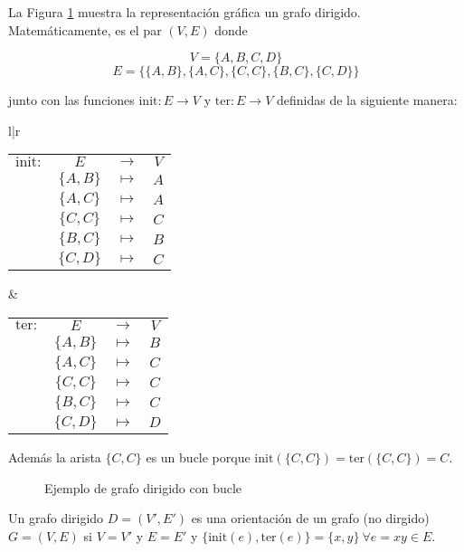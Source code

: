 \begin{ejemplo}
La Figura \ref*{fig:grafo_dirigido} muestra la representación gráfica un grafo dirigido. Matemáticamente, es el par $(V,E)$ donde

\[V  = \{A, B, C, D\}\]
\[E = \{ \{A,B\}, \{A,C\}, \{C,C\},\{B,C\}, \{C,D\} \} \]

junto con las funciones $\mathrm{init} : E \to V $ y $\mathrm{ter} : E \to V$ definidas de la siguiente manera:

\begin{center}
\begin{tabular}{l|r}
\begin{tabular}{r c c c}
$\mathrm{init}:$ & $E$ & $\to$ & $V$\\
			     & $\{A,B\}$ & $\mapsto$ & $A$\\
			     & $\{A,C\}$ & $\mapsto$ & $A$\\
			     & $\{C,C\}$ & $\mapsto$ & $C$\\
			     & $\{B,C\}$ & $\mapsto$ & $B$\\
			     & $\{C,D\}$ & $\mapsto$ & $C$\\
			      
\end{tabular} &
\begin{tabular}{r c c c}
$\mathrm{ter}:$ & $E$ & $\to$ & $V$\\
			     & $\{A,B\}$ & $\mapsto$ & $B$\\
			     & $\{A,C\}$ & $\mapsto$ & $C$\\
			     & $\{C,C\}$ & $\mapsto$ & $C$\\
			     & $\{B,C\}$ & $\mapsto$ & $C$\\
			     & $\{C,D\}$ & $\mapsto$ & $D$\\
			      
\end{tabular} 
\end{tabular}
\end{center}

Además la arista $\{C,C\}$ es un bucle porque $\mathrm{init}(\{C,C\}) = \mathrm{ter}(\{C,C\}) = C$.

\begin{figure}[h]
\centering
\ejemplografodirigido
\caption{Ejemplo de grafo dirigido con bucle}
\label{fig:grafo_dirigido}
\end{figure}

\end{ejemplo}

\begin{defi}
Un grafo dirigido $D = (V', E')$ es una orientación de un grafo (no dirgido) $G = (V,E)$ si $V = V'$ y $E = E'$ y $\{\mathrm{init}(e), \mathrm{ter}(e) \} = \{x,y\} \ \forall e = xy \in E$.
\end{defi}

